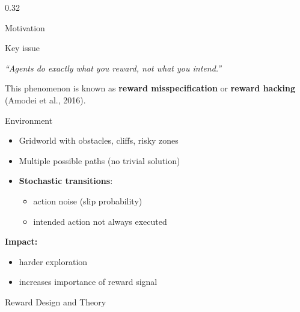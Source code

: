 \begin{frame}[t]
\begin{columns}[t]
\begin{column}{0.32\textwidth}
\begin{block}{Motivation}
				\medskip

				\begin{alertblock}{Key issue}


					\centerline{\textit{``Agents do exactly what you reward, not what you intend.''}}

					\medskip

					This phenomenon is known as \textbf{reward misspecification} or \textbf{reward hacking} (Amodei et al., 2016).

				\end{alertblock}


			\end{block}


			\begin{block}{Environment}

				\begin{itemize}
					\item Gridworld with obstacles, cliffs, risky zones
					\item Multiple possible paths (no trivial solution)
					\item \textbf{Stochastic transitions}:

					      \medskip

					      \begin{itemize}
						      \item action noise (slip probability)

						            \medskip

						      \item intended action not always executed
					      \end{itemize}
				\end{itemize}

				\medskip

				\textbf{Impact:}
				\begin{itemize}
					\item harder exploration
					\item increases importance of reward signal
				\end{itemize}

			\end{block}


			\begin{block}{Reward Design and Theory}


\end{block}
\end{column}
\end{columns}
\end{frame}
